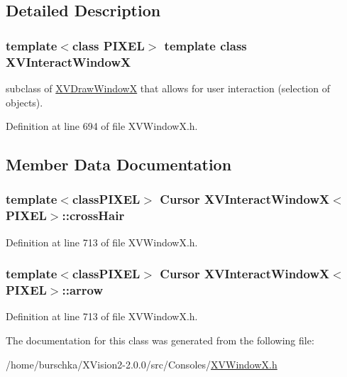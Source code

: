 \subsection{Detailed Description}
\subsubsection*{template$<$class PIXEL$>$  template class XVInteract\-Window\-X}

subclass of \hyperlink{class_XVDrawWindowX}{XVDraw\-Window\-X} that allows for user interaction (selection of objects).





Definition at line 694 of file XVWindow\-X.h.

\subsection{Member Data Documentation}
\label{XVInteractWindowX_n0}
\hypertarget{class_XVInteractWindowX_n0}{
\subsubsection[crossHair]{\setlength{\rightskip}{0pt plus 5cm}template$<$classPIXEL$>$ Cursor XVInteract\-Window\-X$<$PIXEL$>$::cross\-Hair}}




Definition at line 713 of file XVWindow\-X.h.\label{XVInteractWindowX_n1}
\hypertarget{class_XVInteractWindowX_n1}{
\subsubsection[arrow]{\setlength{\rightskip}{0pt plus 5cm}template$<$classPIXEL$>$ Cursor XVInteract\-Window\-X$<$PIXEL$>$::arrow}}




Definition at line 713 of file XVWindow\-X.h.

The documentation for this class was generated from the following file:\begin{CompactItemize}
\item 
/home/burschka/XVision2-2.0.0/src/Consoles/\hyperlink{XVWindowX.h-source}{XVWindow\-X.h}\end{CompactItemize}
